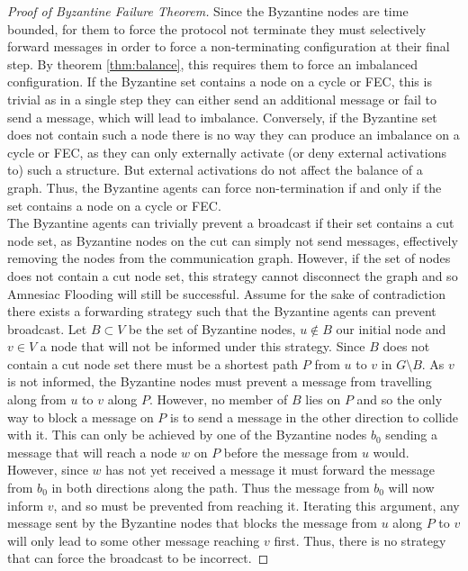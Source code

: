 \begin{proof}[Proof of Byzantine Failure Theorem]
    Since the Byzantine nodes are time bounded, for them to force the protocol not terminate they must selectively forward messages in order to force a non-terminating configuration at their final step. 
    By theorem \ref{thm:balance}, this requires them to force an imbalanced configuration.
    If the Byzantine set contains a node on a cycle or FEC, this is trivial as in a single step they can either send an additional message or fail to send a message, which will lead to imbalance.
    Conversely, if the Byzantine set does not contain such a node there is no way they can produce an imbalance on a cycle or FEC, as they can only externally activate (or deny external activations to) such a structure.
    But external activations do not affect the balance of a graph.
    Thus, the Byzantine agents can force non-termination if and only if the set contains a node on a cycle or FEC.\\

    The Byzantine agents can trivially prevent a broadcast if their set contains a cut node set, as Byzantine nodes on the cut can simply not send messages, effectively removing the nodes from the communication graph.
    However, if the set of nodes does not contain a cut node set, this strategy cannot disconnect the graph and so Amnesiac Flooding will still be successful.
    Assume for the sake of contradiction there exists a forwarding strategy such that the Byzantine agents can prevent broadcast.
    Let $B\subset V$ be the set of Byzantine nodes, $u \not \in B$ our initial node and $v\in V$ a node that will not be informed under this strategy.
    Since $B$ does not contain a cut node set there must be a shortest path $P$ from $u$ to $v$ in $G\setminus B$.
    As $v$ is not informed, the Byzantine nodes must prevent a message from travelling along from $u$ to $v$ along $P$.
    However, no member of $B$ lies on $P$ and so the only way to block a message on $P$ is to send a message in the other direction to collide with it.
    This can only be achieved by one of the Byzantine nodes $b_0$ sending a message that will reach a node $w$ on $P$ before the message from $u$ would.
    However, since $w$ has not yet received a message it must forward the message from $b_0$ in both directions along the path.
    Thus the message from $b_0$ will now inform $v$, and so must be prevented from reaching it.
    Iterating this argument, any message sent by the Byzantine nodes that blocks the message from $u$ along $P$ to $v$ will only lead to some other message reaching $v$ first.
    Thus, there is no strategy that can force the broadcast to be incorrect.
    
\end{proof}